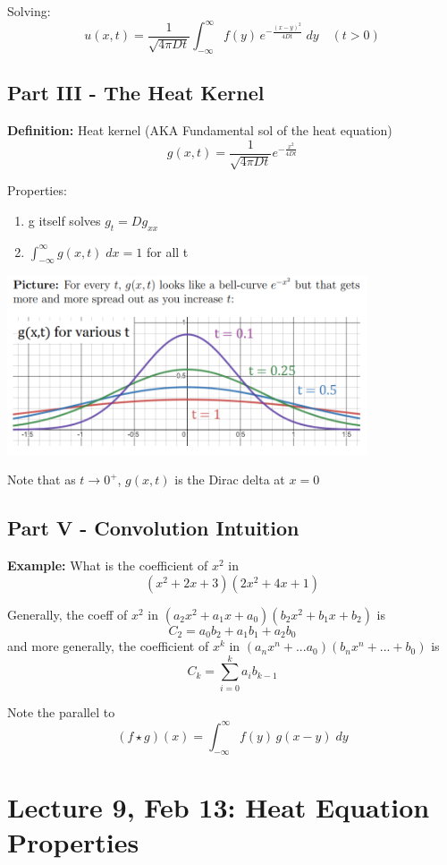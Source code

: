 \documentclass[12pt]{article}
\newcommand{\ans}[1]{\boxed{\text{#1}}}
\begin{document}
Solving:
\[\ans{$u(x, t) = \frac{1}{\sqrt{4\pi Dt}} \int_{-\infty}^\infty f(y)\, e^{-\frac{(x - y)^2}{4Dt}}\; dy$} \quad (t > 0)\]

\subsection*{Part III - The Heat Kernel}
\textbf{Definition:} Heat kernel (AKA Fundamental sol of the heat equation)
\[g(x, t) = \frac{1}{\sqrt{4\pi Dt}}e^{-\frac{x^2}{4Dt}}\]

Properties:
\begin{enumerate}
    \item g itself solves $g_t = Dg_{xx}$
    \item $\int_{-\infty}^\infty g(x, t) \; dx = 1$ for all t 
\end{enumerate}

\includegraphics[width=0.8\textwidth]{Images/heat kernel.png}

Note that as $t \to 0^+$, $g(x, t)$ is the Dirac delta at $x = 0$

\subsection*{Part V - Convolution Intuition}
\textbf{Example:} What is the coefficient of $x^2$ in 
\[(x^2 + 2x + 3)(2x^2 + 4x + 1)\]

Generally, the coeff of $x^2$ in $(a_2x^2 + a_1x + a_0)(b_2x^2+ b_1x + b_2)$ is 
\[C_2 = a_0 b_2 + a_1 b_1 + a_2 b_0\] 
and more generally, the coefficient of $x^k$ in $(a_nx^n + ... a_0)(b_nx^n + ... + b_0)$ is 
\[C_k = \sum_{i=0}^k a_i b_{k-1}\]

Note the parallel to 
\[(f \star g)(x) = \int_{-\infty}^\infty f(y)\, g(x -y) \; dy\]

\section*{Lecture 9, Feb 13: Heat Equation Properties}
\end{document}
